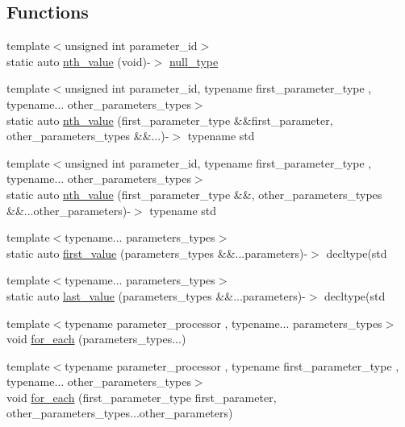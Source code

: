 \subsection*{Functions}
\begin{DoxyCompactItemize}
\item 
{\footnotesize template$<$unsigned int parameter\-\_\-id$>$ }\\static auto \hyperlink{namespacexstd_1_1pp_a64f472b507404fee4aad504684c76040}{nth\-\_\-value} (void)-\/$>$ \hyperlink{structxstd_1_1pp_1_1null__type}{null\-\_\-type}
\item 
{\footnotesize template$<$unsigned int parameter\-\_\-id, typename first\-\_\-parameter\-\_\-type , typename... other\-\_\-parameters\-\_\-types$>$ }\\static auto \hyperlink{namespacexstd_1_1pp_a6cd873bf9694830db9dba2301cc223a5}{nth\-\_\-value} (first\-\_\-parameter\-\_\-type \&\&first\-\_\-parameter, other\-\_\-parameters\-\_\-types \&\&...)-\/$>$ typename std
\item 
{\footnotesize template$<$unsigned int parameter\-\_\-id, typename first\-\_\-parameter\-\_\-type , typename... other\-\_\-parameters\-\_\-types$>$ }\\static auto \hyperlink{namespacexstd_1_1pp_a64a0d91fb344668e87c3d7052c3dfbb5}{nth\-\_\-value} (first\-\_\-parameter\-\_\-type \&\&, other\-\_\-parameters\-\_\-types \&\&...other\-\_\-parameters)-\/$>$ typename std
\item 
{\footnotesize template$<$typename... parameters\-\_\-types$>$ }\\static auto \hyperlink{namespacexstd_1_1pp_aa93a8a507e9fef379bd5d05249b4522e}{first\-\_\-value} (parameters\-\_\-types \&\&...parameters)-\/$>$ decltype(std
\item 
{\footnotesize template$<$typename... parameters\-\_\-types$>$ }\\static auto \hyperlink{namespacexstd_1_1pp_a0fbe1362608c9cc1906521a66ef46026}{last\-\_\-value} (parameters\-\_\-types \&\&...parameters)-\/$>$ decltype(std
\item 
{\footnotesize template$<$typename parameter\-\_\-processor , typename... parameters\-\_\-types$>$ }\\void \hyperlink{namespacexstd_1_1pp_a55868e0a2c2057ea2ba4ee9a938b8f07}{for\-\_\-each} (parameters\-\_\-types...)
\item 
{\footnotesize template$<$typename parameter\-\_\-processor , typename first\-\_\-parameter\-\_\-type , typename... other\-\_\-parameters\-\_\-types$>$ }\\void \hyperlink{namespacexstd_1_1pp_aa29a2aab754d68ff365898122abea2fe}{for\-\_\-each} (first\-\_\-parameter\-\_\-type first\-\_\-parameter, other\-\_\-parameters\-\_\-types...\-other\-\_\-parameters)
\end{DoxyCompactItemize}


